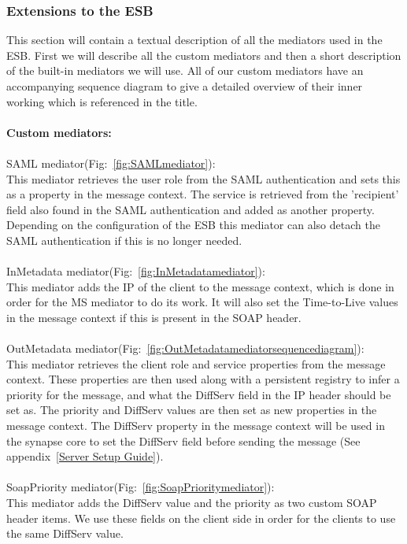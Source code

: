     \subsubsection{Extensions to the ESB}\label{Extensions to the ESB} 
    This section will contain a textual description of all the mediators used in the ESB. First we will describe all the custom mediators and then a short description of the built-in mediators we will use. All of our custom mediators have an accompanying sequence diagram to give a detailed overview of their inner working which is referenced in the title.
\\\\
\textbf{Custom mediators:}\\\\
SAML mediator(Fig:~\ref{fig:SAMLmediator}):\\
    This mediator retrieves the user role from the SAML authentication and sets this as a property in the message context. The service is retrieved from the 'recipient' field also found in the SAML authentication and added as another property. Depending on the configuration of the ESB this mediator can also detach the SAML authentication if this is no longer needed.
\\\\
InMetadata mediator(Fig:~\ref{fig:InMetadatamediator}):\\
	This mediator adds the IP of the client to the message context, which is done in order for the MS mediator to do its work. It will also set the Time-to-Live values in the message context if this is present in the SOAP header.
\\\\
OutMetadata mediator(Fig:~\ref{fig:OutMetadatamediatorsequencediagram}):\\
    This mediator retrieves the client role and service properties from the message context. These properties are then used along with a persistent registry to infer a priority for the message, and what the DiffServ field in the IP header should be set as. The priority and DiffServ values are then set as new properties in the message context.
    The DiffServ property in the message context will be used in the synapse core to set the DiffServ field before sending the message (See appendix~\ref{Server Setup Guide}).
\\\\
SoapPriority mediator(Fig:~\ref{fig:SoapPrioritymediator}):\\
	This mediator adds the DiffServ value and the priority as two custom SOAP header items. We use these fields on the client side in order for the clients to use the same DiffServ value.
